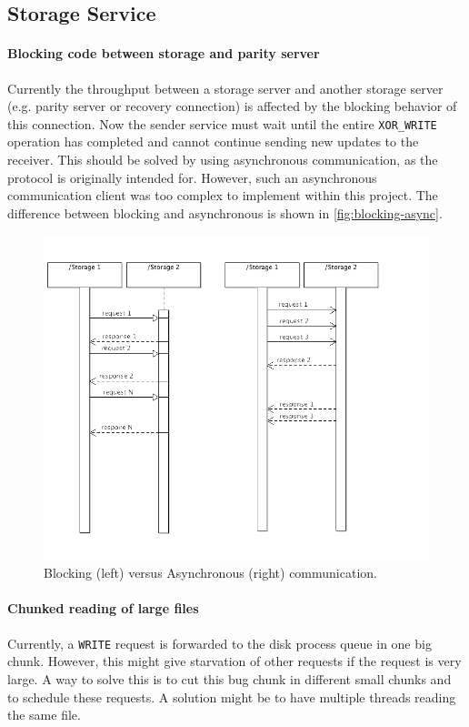 \documentclass[12pt,a4paper]{scrartcl}
\begin{document}
\subsection{Storage Service}
\paragraph{Blocking code between storage and parity server}
Currently the throughput between a storage server and another storage server (e.g. parity server or recovery connection) is affected by the blocking behavior of this connection. Now the sender service must wait until the entire \verb|XOR_WRITE| operation has completed and cannot continue sending new updates to the receiver. This should be solved by using asynchronous communication, as the protocol is originally intended for. However, such an asynchronous communication client was too complex to implement within this project. The difference between blocking and asynchronous is shown in \autoref{fig:blocking-async}.

\begin{figure}[H]
\centering
\includegraphics[width=\textwidth,trim=0 8cm 0 0,clip=true]{diagrams/blocking-async.png}
\caption{Blocking (left) versus Asynchronous (right) communication.}
\label{fig:blocking-async}
\end{figure}

\paragraph{Chunked reading of large files}
Currently, a \verb|WRITE| request is forwarded to the disk process queue in one big chunk. However, this might give starvation of other requests if the request is very large. A way to solve this is to cut this bug chunk in different small chunks and to schedule these requests. A solution might be to have multiple threads reading the same file. 
\end{document}
